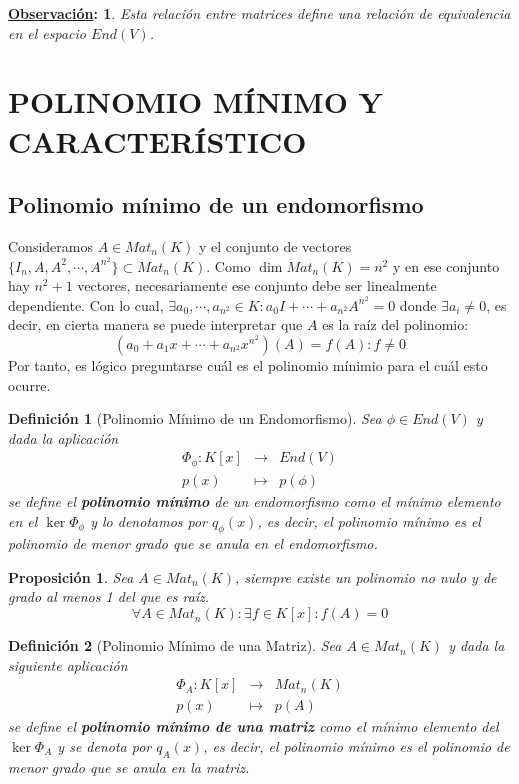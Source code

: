 \documentclass[10pt,a4paper,openright]{book}
\theoremstyle{break}
\newtheorem*{defi}{Definición}
\newtheorem*{prop}{Proposición}
\newtheorem*{obs}{\underline{Observación}:}
\begin{document}
\begin{obs}
Esta relación entre matrices define una relación de equivalencia en el espacio $End(V)$.
\end{obs}

\section{POLINOMIO MÍNIMO Y CARACTERÍSTICO}
\subsection{Polinomio mínimo de un endomorfismo}
Consideramos $A\in Mat_n(K)$ y el conjunto de vectores $\{I_n, A, A^2, \cdots, A^{n^2}\}\subset Mat_n(K)$. Como $\dim Mat_n(K)= n^2$ y en ese conjunto hay $n^2+1$ vectores, necesariamente ese conjunto debe ser linealmente dependiente. Con lo cual, $\exists a_0, \cdots, a_{n^2}\in K: a_0I+\cdots+a_{n^2}A^{n^2}=0$ donde $\exists a_i \neq 0$, es decir, en cierta manera se puede interpretar que $A$ es la raíz del polinomio:
$$(a_0+a_1x+\cdots+a_{n^2}x^{n^2})(A)=f(A): f\neq 0$$
Por tanto, es lógico preguntarse cuál es el polinomio mínimio para el cuál esto ocurre.

\begin{defi}[Polinomio Mínimo de un Endomorfismo]
Sea $\phi \in End(V)$ y dada la aplicación
\begin{eqnarray*}
\Phi_\phi:K[x] &\longrightarrow& End(V) \\ p(x) &\longmapsto& p(\phi) 
\end{eqnarray*}
se define el \textbf{polinomio mínimo} de un endomorfismo como el mínimo elemento en el $\ker \Phi_\phi$ y lo denotamos por $q_\phi(x)$, es decir, el polinomio mínimo es el polinomio de menor grado que se anula en el endomorfismo.
\end{defi}

\begin{prop}
Sea $A\in Mat_n(K)$, siempre existe un polinomio no nulo y de grado al menos 1 del que es raíz.
$$\forall A\in Mat_n(K): \exists f\in K[x]: f(A)=0$$
\end{prop}

\begin{defi}[Polinomio Mínimo de una Matriz]
Sea $A\in Mat_n(K)$ y dada la siguiente aplicación
\begin{eqnarray*}
\Phi_A:K[x] &\longrightarrow& Mat_n(K) \\ p(x) &\longmapsto& p(A) 
\end{eqnarray*}
se define el \textbf{polinomio mínimo de una matriz} como el mínimo elemento del $\ker \Phi_A$ y se denota por $q_A(x)$, es decir, el polinomio mínimo es el polinomio de menor grado que se anula en la matriz.
\end{defi}
\end{document}
